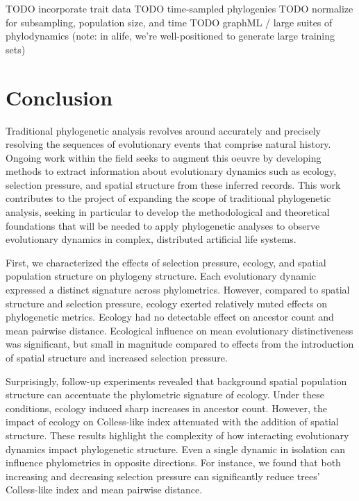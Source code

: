 TODO \citep{nozoe2017inferring} incorporate trait data
TODO \citep{volz2013viral} time-sampled phylogenies
TODO normalize for subsampling, population size, and time
TODO graphML / large suites of phylodynamics (note: in alife, we're well-positioned to generate large training sets)

\section{Conclusion}
\label{sec:conclusion}

Traditional phylogenetic analysis revolves around accurately and precisely resolving the sequences of evolutionary events that comprise natural history.
Ongoing work within the field seeks to augment this oeuvre by developing methods to extract information about evolutionary dynamics such as ecology, selection pressure, and spatial structure from these inferred records.
This work contributes to the project of expanding the scope of traditional phylogenetic analysis, seeking in particular to develop the methodological and theoretical foundations that will be needed to apply phylogenetic analyses to observe evolutionary dynamics in complex, distributed artificial life systems.

First, we characterized the effects of selection pressure, ecology, and spatial population structure on phylogeny structure.
Each evolutionary dynamic expressed a distinct signature across phylometrics.
However, compared to spatial structure and selection pressure, ecology exerted relatively muted effects on phylogenetic metrics.
Ecology had no detectable effect on ancestor count and mean pairwise distance.
Ecological influence on mean evolutionary distinctiveness was significant, but small in magnitude compared to effects from the introduction of spatial structure and increased selection pressure.

Surprisingly, follow-up experiments revealed that background spatial population structure can accentuate the phylometric signature of ecology.
Under these conditions, ecology induced sharp increases in ancestor count.
However, the impact of ecology on Colless-like index attenuated with the addition of spatial structure.
These results highlight the complexity of how interacting evolutionary dynamics impact phylogenetic structure.
Even a single dynamic in isolation can influence phylometrics in opposite directions.
For instance, we found that both increasing and decreasing selection pressure can significantly reduce trees' Colless-like index and mean pairwise distance.


